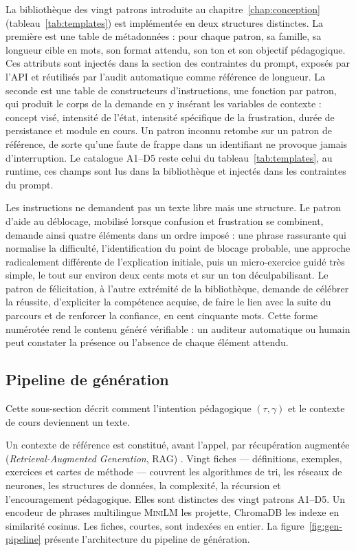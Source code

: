 La bibliothèque des
vingt patrons introduite au chapitre~\ref{chap:conception}
(tableau~\ref{tab:templates}) est implémentée en deux structures distinctes. La
première est une table de métadonnées : pour chaque patron, sa famille,
sa longueur cible en mots, son format attendu, son ton et son objectif pédagogique.
Ces attributs sont injectés dans la
section des contraintes du prompt, exposés par l'API et réutilisés par l'audit
automatique comme référence de longueur. La
seconde est une table de constructeurs d'instructions, une fonction par
patron, qui produit le corps de la demande en y insérant les variables de contexte :
concept visé, intensité de l'état, intensité spécifique de la frustration, durée de
persistance et module en cours. Un patron inconnu retombe sur un patron de
référence, de sorte qu'une faute de frappe dans un identifiant ne provoque jamais
d'interruption. Le catalogue A1--D5 reste celui du
tableau~\ref{tab:templates}, au runtime, ces champs sont lus dans
la bibliothèque et injectés dans les contraintes du prompt.

Les instructions ne demandent pas un texte libre
mais une structure. Le patron d'aide au déblocage, mobilisé lorsque confusion et
frustration se combinent, demande ainsi quatre éléments dans un ordre imposé : une
phrase rassurante qui normalise la difficulté, l'identification du point de blocage
probable, une approche radicalement différente de l'explication initiale, puis un
micro-exercice guidé très simple, le tout sur environ deux cents mots et sur un ton
déculpabilisant. Le patron de félicitation, à l'autre extrémité de la bibliothèque,
demande de célébrer la réussite, d'expliciter la compétence acquise, de faire le
lien avec la suite du parcours et de renforcer la confiance, en cent cinquante mots.
Cette forme numérotée rend le contenu généré vérifiable : un auditeur
automatique ou humain peut constater la présence ou l'absence de chaque
élément attendu.

\subsection{Pipeline de génération}
\label{subsec:impl-pipeline-gen}

Cette sous-section décrit comment l'intention pédagogique
$(\tau,\gamma)$ et le contexte de cours deviennent un texte.

Un contexte de référence est constitué, avant l'appel, par
récupération augmentée (\emph{Retrieval-Augmented Generation}, RAG)
\cite{lewis2020retrieval,gao2023retrieval}. Vingt fiches ---
définitions, exemples, exercices et cartes de méthode --- couvrent
les algorithmes de tri, les réseaux de neurones, les structures de
données, la complexité, la récursion et l'encouragement pédagogique.
Elles sont distinctes des vingt patrons A1--D5. Un encodeur de
phrases multilingue \textsc{MiniLM} \cite{wang2020minilm} les
projette, ChromaDB les indexe en similarité cosinus. Les fiches,
courtes, sont indexées en entier.
La figure~\ref{fig:gen-pipeline} présente l'architecture du pipeline
de génération.

